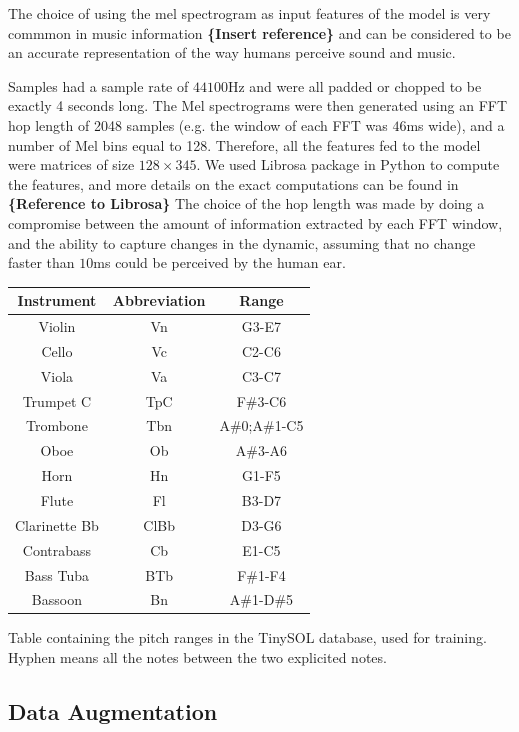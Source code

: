 \documentclass{article}
\begin{document}
The choice of using the mel spectrogram as input features of the model is very commmon in music information \textbf{\{Insert reference\}} and can be considered to be an accurate representation of the way humans perceive sound and music.

Samples had a sample rate of $44100$Hz and were all padded or chopped to be exactly 4 seconds long. The Mel spectrograms were then generated using an FFT hop length of 2048 samples (e.g. the window of each FFT was $46$ms wide), and a number of Mel bins equal to 128. Therefore, all the features fed to the model were matrices of size $128\times 345$. We used Librosa package in Python to compute the features, and more details on the exact computations can be found in \textbf{\{Reference to Librosa\}} The choice of the hop length was made by doing a compromise between the amount of information extracted by each FFT window, and the ability to capture changes in the dynamic, assuming that no change faster than $10$ms could be perceived by the human ear.

\begin{table}
\begin{tabular}{|c|c|c|}
\hline
Instrument & Abbreviation & Range \\
\hline
Violin & Vn & G3-E7\\
Cello & Vc & C2-C6\\
Viola & Va & C3-C7\\
Trumpet C & TpC & F\#3-C6\\
Trombone & Tbn & A\#0;A\#1-C5\\
Oboe & Ob & A\#3-A6\\
Horn & Hn & G1-F5\\
Flute & Fl & B3-D7\\
Clarinette Bb & ClBb & D3-G6\\
Contrabass & Cb & E1-C5\\
Bass Tuba & BTb & F\#1-F4\\
Bassoon & Bn & A\#1-D\#5\\
\hline
\end{tabular}
\begin{caption}Table containing the pitch ranges in the TinySOL database, used for training. Hyphen means all the notes between the two explicited notes. \label{tab_pitch}
\end{caption}
\end{table}

\subsection{Data Augmentation}
\end{document}

